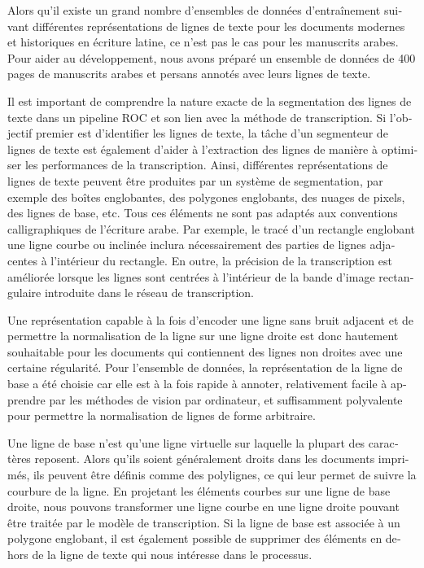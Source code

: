 \begin{french}
Alors qu'il existe un grand nombre d'ensembles de données d'entraînement
suivant différentes représentations de lignes de texte pour les documents
modernes et historiques en écriture latine, ce n'est pas le cas pour les
manuscrits arabes. Pour aider au développement, nous avons préparé un ensemble
de données de 400 pages de manuscrits arabes et persans annotés avec leurs
lignes de texte.

Il est important de comprendre la nature exacte de la segmentation des lignes
de texte dans un pipeline ROC et son lien avec la méthode de transcription. Si
l'objectif premier est d'identifier les lignes de texte, la tâche d'un
segmenteur de lignes de texte est également d'aider à l'extraction des lignes
de manière à optimiser les performances de la transcription. Ainsi, différentes
représentations de lignes de texte peuvent être produites par un système de
segmentation, par exemple des boîtes englobantes, des polygones englobants, des
nuages de pixels, des lignes de base, etc. Tous ces éléments ne sont pas
adaptés aux conventions calligraphiques de l'écriture arabe. Par exemple, le
tracé d'un rectangle englobant une ligne courbe ou inclinée inclura
nécessairement des parties de lignes adjacentes à l'intérieur du rectangle.  En
outre, la précision de la transcription est améliorée lorsque les lignes sont
centrées à l'intérieur de la bande d'image rectangulaire introduite dans le
réseau de transcription.

Une représentation capable à la fois d'encoder une ligne sans bruit adjacent et
de permettre la normalisation de la ligne sur une ligne droite est donc
hautement souhaitable pour les documents qui contiennent des lignes non droites
avec une certaine régularité.  Pour l'ensemble de données, la représentation de
la ligne de base a été choisie car elle est à la fois rapide à annoter,
relativement facile à apprendre par les méthodes de vision par ordinateur, et
suffisamment polyvalente pour permettre la normalisation de lignes de forme
arbitraire.

Une ligne de base n'est qu'une ligne virtuelle sur laquelle la plupart des
caractères reposent. Alors qu'ils soient généralement droits dans les documents
imprimés, ils peuvent être définis comme des polylignes, ce qui leur permet de
suivre la courbure de la ligne. En projetant les éléments courbes sur une ligne
de base droite, nous pouvons transformer une ligne courbe en une ligne droite
pouvant être traitée par le modèle de transcription. Si la ligne de base est
associée à un polygone englobant, il est également possible de supprimer des
éléments en dehors de la ligne de texte qui nous intéresse dans le processus.


\end{french}
